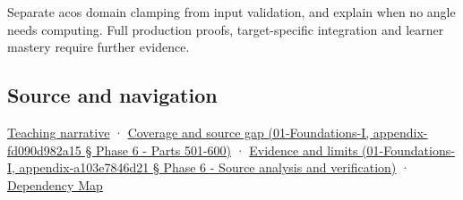 Separate acos domain clamping from input validation, and explain when no angle needs computing. Full production proofs, target-specific integration and learner mastery require further evidence.

\subsection{Source and navigation}\label{source-and-navigation}

\href{Continuous\%20Notes/Computing\%20Foundations\%20-\%20From\%20Bits\%20to\%20C++\%20and\%20Systems\%20APIs\#An\%20angle\%20is\%20a\%20question\%20with\%20a\%20domain}{Teaching narrative} · \href{}{Coverage and source gap (01-Foundations-I, appendix-fd090d982a15 § Phase 6 - Parts 501-600)} · \href{}{Evidence and limits (01-Foundations-I, appendix-a103e7846d21 § Phase 6 - Source analysis and verification)} · \hyperref[appendix-4ad47bdd269a]{Dependency Map}
